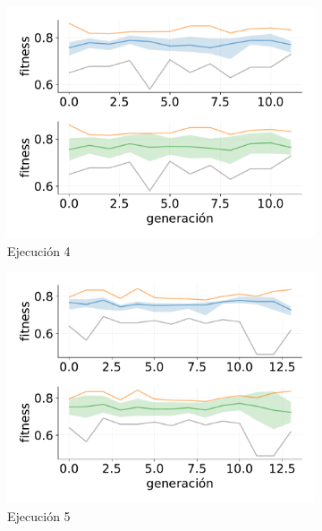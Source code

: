 \begin{figure}
\begin{subfigure}{0.47\textwidth}
        \centering
        \includegraphics[width=\textwidth]{figuras/experimentos/exp_no_elitismo/no_elitismo_4.pdf}
        \caption{Ejecución 4}
    \end{subfigure}
    \hfill
    \begin{subfigure}{0.47\textwidth}
        \centering
        \includegraphics[width=\textwidth]{figuras/experimentos/exp_no_elitismo/no_elitismo_5.pdf}
        \caption{Ejecución 5}
    \end{subfigure}
    \hfill
    \begin{subfigure}{0.47\textwidth}
        \centering

\end{subfigure}
\end{figure}
